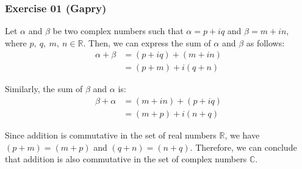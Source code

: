 \subsubsection*{Exercise 01 (Gapry)}

\begin{flushleft}
Let $\alpha$ and $\beta$ be two complex numbers such that $\alpha = p + iq$ and $\beta  = m + in$, where $p,\ q,\ m,\ n \in \mathbb{R}$. Then, we can express the sum of $\alpha$ and $\beta$ as follows:
\begin{align*}
\alpha + \beta &= (p + iq) + (m + in) \\
               &= (p + m) + i(q + n)
\end{align*}

Similarly, the sum of $\beta$ and $\alpha$ is:
\begin{align*}
\beta  + \alpha &= (m + in) + (p + iq) \\
                &= (m + p) + i(n + q)
\end{align*}

Since addition is commutative in the set of real numbers $\mathbb{R}$, we have $(p + m) = (m + p)$ and $(q + n) = (n + q)$. Therefore, we can conclude that addition is also commutative in the set of complex numbers $\mathbb{C}$.
\end{flushleft}